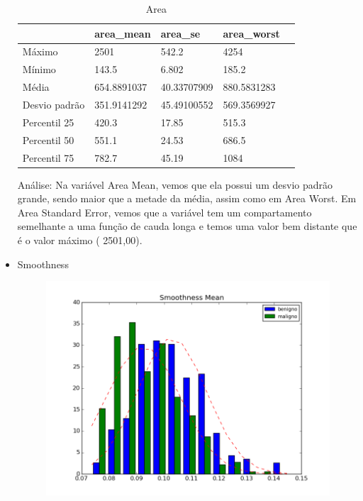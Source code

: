 \documentclass[11pt,a4paper]{article}
\numberwithin{equation}{section}
\begin{document}
\begin{itemize}
\begin{table}[H]
\centering
\caption{Area}
\label{my-label}
\begin{tabular}{lllll} \hline
              & area\_mean  & area\_se    & area\_worst &  \\ \hline
Máximo        & 2501        & 542.2       & 4254        &  \\
Mínimo        & 143.5       & 6.802       & 185.2       &  \\
Média         & 654.8891037 & 40.33707909 & 880.5831283 &  \\
Desvio padrão & 351.9141292 & 45.49100552 & 569.3569927 &  \\
Percentil 25  & 420.3       & 17.85       & 515.3       &  \\
Percentil 50  & 551.1       & 24.53       & 686.5       &  \\
Percentil 75  & 782.7       & 45.19       & 1084        &  \\ \hline
\end{tabular}
\end{table}

Análise: Na variável Area Mean, vemos que ela possui um desvio padrão grande, sendo maior que a metade da média, assim como em Area Worst. Em Area Standard Error, vemos que a variável tem um compartamento semelhante a uma função de cauda longa e temos uma valor bem distante que é o valor máximo ( 2501,00). 


\item Smoothness
\begin{figure}[H]
\centering
  \includegraphics[width=.5\linewidth]{../img/hist/smoothness_mean}
  \label{fig:test1}
\end{figure}%


\end{itemize}
\end{document}
